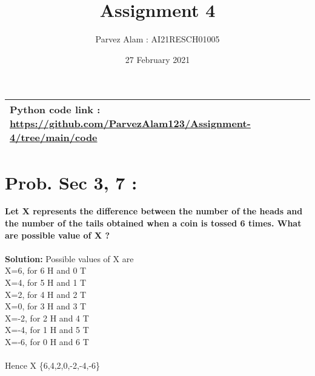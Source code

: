 \documentclass{article}
\title{Assignment 4}
\author{Parvez Alam : AI21RESCH01005 }
\date{ 27 February 2021}
\begin{document}
\maketitle
\begin{multicols}{2}
\begin{center}
    \begin{tabular}{|p{5cm}|}
         \hline
         Python code link : \url{https://github.com/ParvezAlam123/Assignment-4/tree/main/code}\\
         \hline
          
    \end{tabular}
\end{center}

\section{Prob. Sec 3, 7 :}
\textbf{Let X represents the difference between the number of the heads and the number of the tails obtained when a coin is tossed 6 times. What are possible value of X ?} \\ \\
\textbf{Solution:} Possible values of X are \\
X=6, for 6 H and 0 T \\
X=4, for 5 H and 1 T \\
X=2, for 4 H and 2 T \\
X=0, for 3 H and 3 T \\
X=-2, for 2 H and 4 T \\
X=-4, for 1 H and 5 T \\
X=-6, for 0 H and 6 T \\ \\
Hence X \in \{6,4,2,0,-2,-4,-6\}

\end{multicols}
\end{document}
